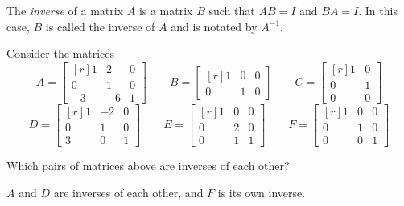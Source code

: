 \documentclass{problemset}
\newcommand{\mat}[1]{\begin{bmatrix*}[r]#1\end{bmatrix*}}
\begin{document}
	\begin{definition}
		The \emph{inverse} of a matrix $A$ is a
		matrix $B$ such that $AB=I$ and $BA=I$.
		In this case, $B$ is called the inverse of $A$ and is notated by $A^{-1}$.
	\end{definition}

	\question
	Consider the matrices 
	\[
		A=\mat{1&2&0\\0&1&0\\-3&-6&1}\qquad
		B=\mat{1&0&0\\0&1&0}\qquad
		C=\mat{1&0\\0&1\\0&0}
	\]
	\[
		D=\mat{1&-2&0\\0&1&0\\3&0&1}\qquad
		E=\mat{1&0&0\\0&2&0\\0&1&1}\qquad
		F=\mat{1&0&0\\0&1&0\\0&0&1}
	\]
	\begin{parts}
		\item Which pairs of matrices above are inverses of each other?
			\begin{solution}
				$A$ and $D$ are inverses of each other, and $F$ is its own 
				inverse. 
			\end{solution}
	\end{parts}
\end{document}
